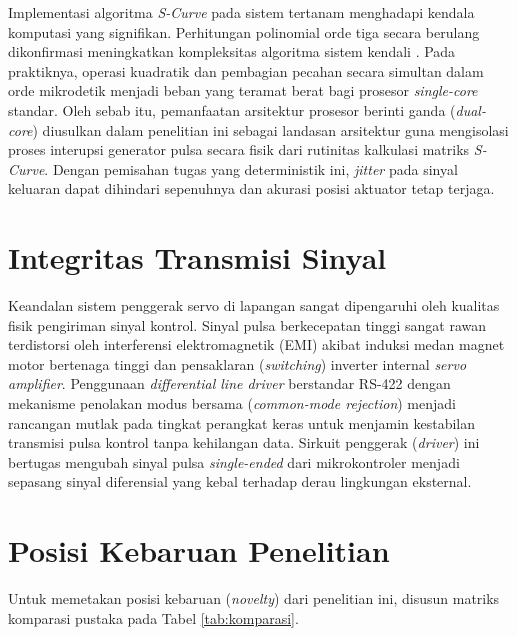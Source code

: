Implementasi algoritma \textit{S-Curve} pada sistem tertanam menghadapi kendala
komputasi yang signifikan. Perhitungan polinomial orde tiga secara berulang
dikonfirmasi meningkatkan kompleksitas algoritma sistem kendali
\parencite{liu2023time}. Pada praktiknya, operasi kuadratik dan pembagian
pecahan secara simultan dalam orde mikrodetik menjadi beban yang teramat berat
bagi prosesor \textit{single-core} standar. Oleh sebab itu, pemanfaatan
arsitektur prosesor berinti ganda (\textit{dual-core}) diusulkan dalam
penelitian ini sebagai landasan arsitektur guna mengisolasi proses interupsi
generator pulsa secara fisik dari rutinitas kalkulasi matriks \textit{S-Curve}.
Dengan pemisahan tugas yang deterministik ini, \textit{jitter} pada sinyal
keluaran dapat dihindari sepenuhnya dan akurasi posisi aktuator tetap terjaga.

\section{Integritas Transmisi Sinyal}

Keandalan sistem penggerak servo di lapangan sangat dipengaruhi oleh kualitas
fisik pengiriman sinyal kontrol. Sinyal pulsa berkecepatan tinggi sangat rawan
terdistorsi oleh interferensi elektromagnetik (EMI) akibat induksi medan magnet
motor bertenaga tinggi dan pensaklaran (\textit{switching}) inverter internal
\textit{servo amplifier}. Penggunaan \textit{differential line driver}
berstandar RS-422 dengan mekanisme penolakan modus bersama (\textit{common-mode
rejection}) menjadi rancangan mutlak pada tingkat perangkat keras untuk menjamin
kestabilan transmisi pulsa kontrol tanpa kehilangan data. Sirkuit penggerak
(\textit{driver}) ini bertugas mengubah sinyal pulsa \textit{single-ended} dari
mikrokontroler menjadi sepasang sinyal diferensial yang kebal terhadap derau
lingkungan eksternal.

\section{Posisi Kebaruan Penelitian}

Untuk memetakan posisi kebaruan (\textit{novelty}) dari penelitian ini, disusun
matriks komparasi pustaka pada Tabel \ref{tab:komparasi}.
\newpage

